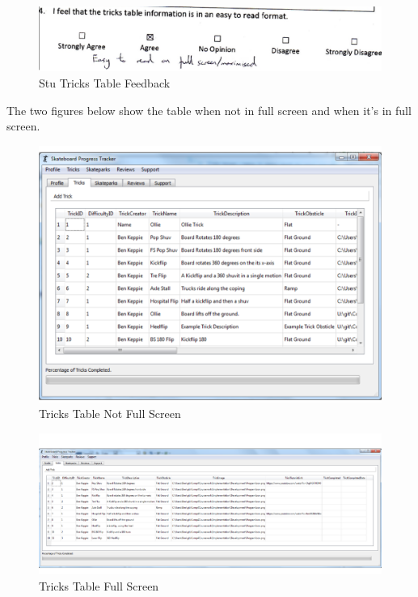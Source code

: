 \begin{figure}[H]
    \includegraphics[width=\textwidth]{./Evaluation/images/StuTricks.pdf}
    \caption{Stu Tricks Table Feedback} \label{fig:StuTricksFeedback}
\end{figure}

 The two figures below show the table when not in full screen and when it's in full screen.

\begin{figure}[H]
    \includegraphics[width=\textwidth]{./Evaluation/images/TricksTableNFS.pdf}
    \caption{Tricks Table Not Full Screen} \label{fig:TricksTableNFS}
\end{figure}

\begin{figure}[H]
    \includegraphics[width=\textwidth]{./Evaluation/images/TricksTableFS.pdf}
    \caption{Tricks Table Full Screen} \label{fig:TricksTableFS}
\end{figure} 


